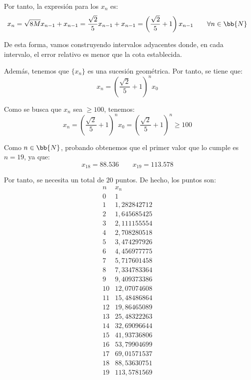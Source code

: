 \begin{ejercicio}
\begin{enumerate}
        Por tanto, la expresión para los $x_n$ es:
        \begin{equation*}
            x_n = \sqrt{8M}x_{n-1} + x_{n-1} = \frac{\sqrt{2}}{5}x_{n-1} + x_{n-1} = \left(\frac{\sqrt{2}}{5}+1\right)x_{n-1} \qquad \forall n\in \bb{N}
        \end{equation*}

        De esta forma, vamos construyendo intervalos adyacentes donde, en cada intervalo, el error relativo es menor que la cota establecida.

        Además, tenemos que $\{x_n\}$ es una sucesión geométrica. Por tanto, se tiene que:
        \begin{equation*}
            x_n = \left(\frac{\sqrt{2}}{5}+1\right)^n x_0
        \end{equation*}

        Como se busca que $x_n$ sea $\geq 100$, tenemos:
        \begin{equation*}
            x_n = \left(\frac{\sqrt{2}}{5}+1\right)^n x_0 = \left(\frac{\sqrt{2}}{5}+1\right)^n \geq 100
        \end{equation*}

        Como $n\in \bb{N}$, probando obtenemos que el primer valor que lo cumple es $n=19$, ya que:
        \begin{equation*}
            x_{18}=88.536 \qquad x_{19}=113.578
        \end{equation*}

        Por tanto, se necesita un total de $20$ puntos. De hecho, los puntos son:
        \begin{equation*}
        \begin{array}{c|c}
        n   &  x_n       \\ \hline
        0  & 1           \\
        1  & 1,282842712 \\
        2  & 1,645685425 \\
        3  & 2,111155554 \\
        4  & 2,708280518 \\
        5  & 3,474297926 \\
        6  & 4,456977775 \\
        7  & 5,717601458 \\
        8  & 7,334783364 \\
        9  & 9,409373386 \\
        10 & 12,07074608 \\
        11 & 15,48486864 \\
        12 & 19,86465089 \\
        13 & 25,48322263 \\
        14 & 32,69096644 \\
        15 & 41,93736806 \\
        16 & 53,79904699 \\
        17 & 69,01571537 \\
        18 & 88,53630751 \\
        19 & 113,5781569
        \end{array}
        \end{equation*}


\end{enumerate}
\end{ejercicio}
